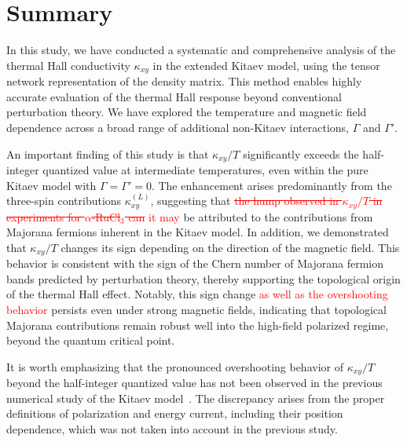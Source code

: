 \documentclass[twocolumn,superscriptaddress,showpacs, longbibliography, aps, prx]{revtex4-2}
\newcommand{\red}[1]{\textcolor{red}{#1}}
\newcommand{\redsout}[1]{\textcolor{red}{\sout{#1}}}
\begin{document}
\section{Summary}
\label{sec:Summary}
In this study, we have conducted a systematic and comprehensive analysis of the thermal Hall conductivity $\kappa_{xy}$ in the extended Kitaev model, using the tensor network representation of the density matrix. 
This method enables highly accurate evaluation of the thermal Hall response beyond conventional perturbation theory. 
We have explored the temperature and magnetic field dependence across a broad range of additional non-Kitaev interactions, $\Gamma$ and $\Gamma'$. 

An important finding of this study is that $\kappa_{xy}/T$ significantly exceeds the half-integer quantized value at intermediate temperatures, even within the pure Kitaev model with $\Gamma=\Gamma'=0$. 
The enhancement arises predominantly from the three-spin contributions $\kappa_{xy}^{(L)}$, suggesting that \redsout{the hump observed in $\kappa_{xy}/T$ in experiments for $\alpha$-RuCl$_3$ can} \red{it may} be attributed to the contributions from Majorana fermions inherent in the Kitaev model. 
In addition, we demonstrated that $\kappa_{xy}/T$ changes its sign depending on the direction of the magnetic field. 
This behavior is consistent with the sign of the Chern number of Majorana fermion bands predicted by perturbation theory, thereby supporting the topological origin of the thermal Hall effect. 
Notably, this sign change \red{as well as the overshooting behavior} persists even under strong magnetic fields, indicating that topological Majorana contributions remain robust well into the high-field polarized regime, beyond the quantum critical point. 

It is worth emphasizing that the pronounced overshooting behavior of $\kappa_{xy}/T$ beyond the half-integer quantized value has not been observed in the previous numerical study of the Kitaev model~\cite{KumarT2023}. 
The discrepancy arises from the proper definitions of polarization and energy current, including their position dependence, which was not taken into account in the previous study. 
\end{document}
